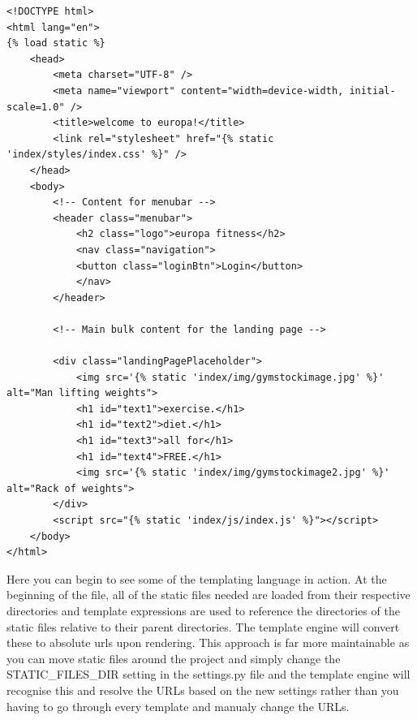 \documentclass{article}
\begin{document}
\begin{lstlisting}[caption={templates/index.html}]
<!DOCTYPE html>
<html lang="en">
{% load static %}
    <head>
        <meta charset="UTF-8" />
        <meta name="viewport" content="width=device-width, initial-scale=1.0" />
        <title>welcome to europa!</title>
        <link rel="stylesheet" href="{% static 'index/styles/index.css' %}" />
    </head>
    <body>
        <!-- Content for menubar -->
        <header class="menubar">
            <h2 class="logo">europa fitness</h2>
            <nav class="navigation">
            <button class="loginBtn">Login</button>
            </nav>
        </header>

        <!-- Main bulk content for the landing page -->

        <div class="landingPagePlaceholder">
            <img src='{% static 'index/img/gymstockimage.jpg' %}' alt="Man lifting weights">
            <h1 id="text1">exercise.</h1>
            <h1 id="text2">diet.</h1>
            <h1 id="text3">all for</h1>
            <h1 id="text4">FREE.</h1>
            <img src='{% static 'index/img/gymstockimage2.jpg' %}' alt="Rack of weights">
        </div>
        <script src="{% static 'index/js/index.js' %}"></script>
    </body>
</html>
\end{lstlisting}

Here you can begin to see some of the templating language in action. At the beginning of the file, all of the static files needed are loaded from their respective directories and template expressions are used to reference the directories of the static files relative to their parent directories. The template engine will convert these to absolute urls upon rendering. This approach is far more maintainable as you can move static files around the project and simply change the STATIC\_FILES\_DIR setting in the settings.py file and the template engine will recognise this and resolve the URLs based on the new settings rather than you having to go through every template and manualy change the URLs.  
\end{document}
